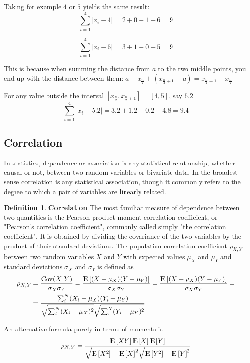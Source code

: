 \documentclass[12pt, letterpaper]{article}
\theoremstyle{definition}
\newtheorem{definition}{Definition}[section]
\newcommand{\E}{{\rm I\kern-.3em E}}
\newcommand{\Cov}{\mathrm{Cov}}
\DeclarePairedDelimiter\autobracket{(}{)}
\newcommand{\br}[1]{\autobracket*{#1}}
\begin{document}
Taking for example $4$ or $5$ yields the same result:
$$
\sum_{i=1}^4|x_i-4|=2+0+1+6=9
$$

$$
\sum_{i=1}^4|x_i-5|=3+1+0+5=9
$$

This is because when summing the distance from $a$ to the two middle points, you end up with the distance between them: $a-x_{\tfrac{n}{2}}+(x_{\tfrac{n}{2}+1}-a) = x_{\tfrac{n}{2}+1}-x_{\tfrac{n}{2}}$

For any value outside the interval $\left[x_{\tfrac{n}{2}},x_{\tfrac{n}{2}+1}\right]=[4,5]$, say $5.2$
$$
\sum_{i=1}^4|x_i-5.2|=3.2+1.2+0.2+4.8=9.4
$$

\subsection{Correlation}
In statistics, dependence or association is any statistical relationship, whether causal or not, between two random variables or bivariate data. In the broadest sense correlation is any statistical association, though it commonly refers to the degree to which a pair of variables are linearly related.
\begin{definition}{\textbf{Correlation}}
The most familiar measure of dependence between two quantities is the Pearson product-moment correlation coefficient, or "Pearson's correlation coefficient", commonly called simply "the correlation coefficient". It is obtained by dividing the covariance of the two variables by the product of their standard deviations. The population correlation coefficient $\rho_{X,Y}$ between two random variables $X$ and $Y$ with expected values $\mu_X$ and $\mu_Y$ and standard deviations $\sigma _{X}$ and $\sigma_Y$ is defined as
\begin{equation}
\begin{aligned}
\rho_{X,Y}&= \frac{\Cov(X,Y)}{\sigma_X \sigma_Y} = \frac{\E\left[ \br{X -\mu_X} \br{Y -\mu_Y}\right]}{\sigma_X \sigma_Y} = \frac{\E\left[ \br{X -\mu_X} \br{Y -\mu_Y}\right]}{\sigma_X \sigma_Y} =\\
&= \frac{\sum_i^N \br{X_i -\mu_X} \br{Y_i -\mu_Y}}{\sqrt{\sum_i^N(X_i-\mu_X)^2}\sqrt{\sum_i^N(Y_i-\mu_Y)^2}}
\end{aligned}
\end{equation}

An alternative formula purely in terms of moments is
\begin{equation}
\rho_{X,Y} = \frac{  \E\left[ XY \right]     \E\left[ X \right]   \E\left[ Y \right]   }   {\sqrt{\E\left[ X^2\right]-\E\left[ X\right]^2}                      \sqrt{  \E\left[ Y^2\right] -    \E\left[ Y \right]^2} } 
\end{equation}
\end{definition}
\end{document}
